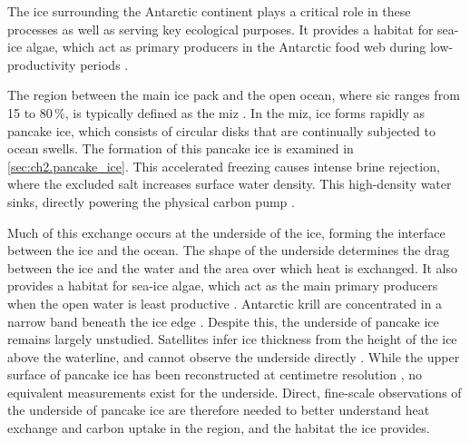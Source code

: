The ice surrounding the Antarctic continent plays a critical role in these processes as well
as serving key ecological purposes. 
It provides a habitat for sea-ice algae, which act as primary producers in the Antarctic food web during low-productivity periods \cite{lizotteContributionsSeaIce2001}.


 The region between the main ice pack and the open ocean, where \gls{sic} ranges from 15 to 80\,\%, is
 typically defined as the \gls{miz} \cite{dumontMarginalIceZone}.
 In the \gls{miz}, ice forms rapidly as pancake ice, which consists of circular disks that are continually subjected to ocean swells. The formation
 of this pancake ice is examined in \autoref{sec:ch2.pancake_ice}.
 This accelerated freezing causes intense brine rejection, where the excluded salt increases surface water density. 
 This high-density water sinks, directly powering the physical carbon pump
 \cite{gruberOceanicSinkAnthropogenic2019}. 


Much of this exchange occurs at the underside of the ice, forming the interface between the ice and the ocean. 
The shape of the underside determines the drag between the ice and the water and the area over which heat is exchanged. 
It also provides a habitat for sea-ice algae, which act as the main primary producers when the open water is 
least productive \cite{lizotteContributionsSeaIce2001}. Antarctic krill are concentrated in a narrow band 
beneath the ice edge \cite{brierleyAntarcticKrillSea2002}.
Despite this, the underside of pancake ice remains largely unstudied. Satellites infer ice thickness from the 
height of the ice above the waterline, and cannot observe the underside directly \cite{zygmuntowskaUncertaintiesArcticSea2014}. 
While the upper surface of pancake ice has been reconstructed at centimetre resolution \cite{spirakis3DReconstructionPancake2023}, 
no equivalent measurements exist for the underside.
Direct, fine-scale observations of the underside of pancake ice are therefore needed to better understand heat exchange and carbon uptake in the region, and the habitat the ice provides.


